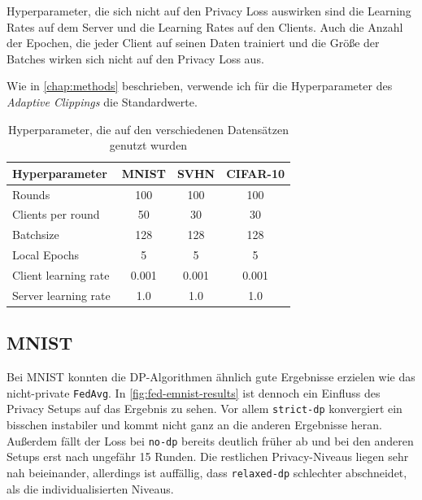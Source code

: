 Hyperparameter, die sich nicht auf den Privacy Loss auswirken sind die Learning Rates auf dem Server und die Learning Rates auf den Clients. Auch die Anzahl der Epochen, die jeder Client auf seinen Daten trainiert und die Größe der Batches wirken sich nicht auf den Privacy Loss aus.

Wie in \autoref{chap:methods} beschrieben, verwende ich für die Hyperparameter des \textit{Adaptive Clippings} die Standardwerte.

\begin{table}[tb]
	\centering
	\begin{tabular}{lccc}
		\toprule
		Hyperparameter & MNIST & SVHN & CIFAR-10 \\
		\midrule
		Rounds & 100 & 100 & 100 \\
		Clients per round & 50 & 30 & 30 \\
		Batchsize & 128 & 128 & 128 \\
		Local Epochs & 5 & 5 & 5 \\
		Client learning rate & 0.001 & 0.001 & 0.001 \\
		Server learning rate & 1.0 & 1.0 & 1.0 \\
		\bottomrule
	\end{tabular}
	\caption{Hyperparameter, die auf den verschiedenen Datensätzen genutzt wurden}
	\label{tab:fl-hyperparameters}
\end{table}

\subsection{MNIST}

Bei MNIST konnten die DP-Algorithmen ähnlich gute Ergebnisse erzielen wie das nicht-private \texttt{FedAvg}. In \autoref{fig:fed-emnist-results} ist dennoch ein Einfluss des Privacy Setups auf das Ergebnis zu sehen. Vor allem \texttt{strict-dp} konvergiert ein bisschen instabiler und kommt nicht ganz an die anderen Ergebnisse heran. Außerdem fällt der Loss bei \texttt{no-dp} bereits deutlich früher ab und bei den anderen Setups erst nach ungefähr 15 Runden. Die restlichen Privacy-Niveaus liegen sehr nah beieinander, allerdings ist auffällig, dass \texttt{relaxed-dp} schlechter abschneidet, als die individualisierten Niveaus.

